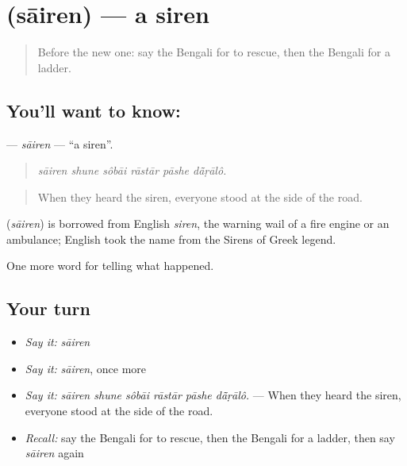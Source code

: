 \section[\texorpdfstring{\bn{সাইরেন} (sāiren)}{সাইরেন (sāiren)}]{ (sāiren) — a siren}

\label{lesson:BN-C280-sairen}



\begin{quote}
Before the new one: say the Bengali for to rescue, then the Bengali for a ladder.
\end{quote}

\subsection*{You'll want to know: }
\textbf{} — \emph{sāiren} — \textquotedblleft{}a siren\textquotedblright{}.

\begin{quote}
     
\end{quote}

\begin{quote}
\emph{sāiren shune sôbāi rāstār pāshe dā̃ṛālô.}
\end{quote}

\begin{quote}
When they heard the siren, everyone stood at the side of the road.
\end{quote}

\begin{cousinweb}
\textbf{} (\emph{sāiren}) is borrowed from English \emph{siren}, the warning wail of a fire engine or an ambulance; English took the name from the Sirens of Greek legend.
\end{cousinweb}

\begin{grammarlens}[title={What you've built}]
One more word for telling what happened.
\end{grammarlens}

\subsection*{Your turn}
\begin{itemize}
\raggedright
  \item \emph{Say it:} \emph{sāiren}
  \item \emph{Say it:} \emph{sāiren}, once more
  \item \emph{Say it:} \emph{sāiren shune sôbāi rāstār pāshe dā̃ṛālô.} — When they heard the siren, everyone stood at the side of the road.
  \item \emph{Recall:} say the Bengali for to rescue, then the Bengali for a ladder, then say \emph{sāiren} again
\end{itemize}

